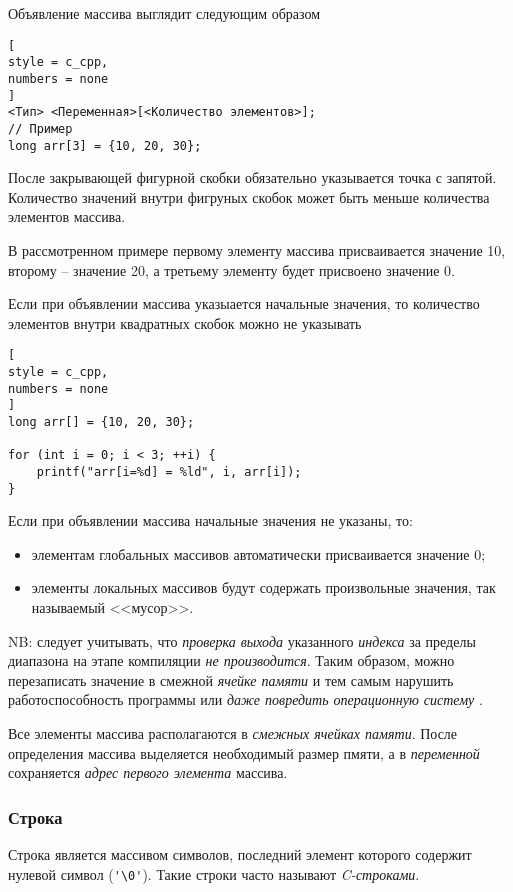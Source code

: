 \documentclass[%
	11pt,
	a4paper,
	utf8,
		]{article}
\begin{document}
Объявление массива выглядит следующим образом
\begin{lstlisting}[
style = c_cpp,
numbers = none
]
<Тип> <Переменная>[<Количество элементов>];
// Пример
long arr[3] = {10, 20, 30};
\end{lstlisting}

После закрывающей фигурной скобки обязательно указывается точка с запятой. Количество значений внутри фигруных скобок может быть меньше количества элементов массива.

В рассмотренном примере первому элементу массива присваивается значение 10, второму -- значение 20, а третьему элементу будет присвоено значение 0.

Если при объявлении массива указыается начальные значения, то количество элементов внутри квадратных скобок можно не указывать
\begin{lstlisting}[
style = c_cpp,
numbers = none
]
long arr[] = {10, 20, 30};

for (int i = 0; i < 3; ++i) {
    printf("arr[i=%d] = %ld", i, arr[i]);
}
\end{lstlisting}

Если при объявлении массива начальные значения не указаны, то:
\begin{itemize}
	\item элементам глобальных массивов автоматически присваивается значение 0;
	
	\item элементы локальных массивов будут содержать произвольные значения, так называемый <<мусор>>.
\end{itemize}

NB: следует учитывать, что \emph{проверка выхода} указанного \emph{индекса} за пределы диапазона на этапе компиляции \emph{\color{red}не производится}. Таким образом, можно перезаписать значение в смежной \emph{ячейке памяти} и тем самым нарушить работоспособность программы или \emph{даже повредить операционную систему} \cite[]{prokhorenok-prog-c:2020}.

Все элементы массива располагаются в \emph{смежных ячейках памяти}. После определения массива выделяется необходимый размер пмяти, а в \emph{переменной} сохраняется \emph{адрес первого элемента} массива.

\subsubsection{Строка}

Строка является массивом символов, последний элемент которого содержит нулевой символ (\verb*|'\0'|). Такие строки часто называют \emph{C-строками}.
\end{document}
